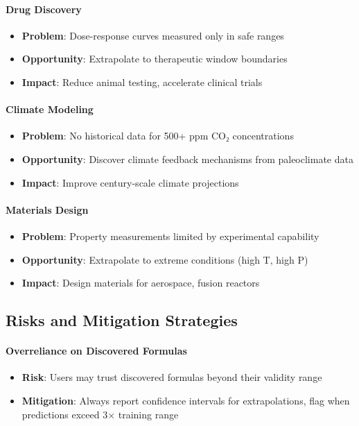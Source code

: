 \paragraph{Drug Discovery}
\begin{itemize}
    \item \textbf{Problem}: Dose-response curves measured only in safe ranges
    \item \textbf{Opportunity}: Extrapolate to therapeutic window boundaries
    \item \textbf{Impact}: Reduce animal testing, accelerate clinical trials
\end{itemize}

\paragraph{Climate Modeling}
\begin{itemize}
    \item \textbf{Problem}: No historical data for 500+ ppm CO₂ concentrations
    \item \textbf{Opportunity}: Discover climate feedback mechanisms from paleoclimate data
    \item \textbf{Impact}: Improve century-scale climate projections
\end{itemize}

\paragraph{Materials Design}
\begin{itemize}
    \item \textbf{Problem}: Property measurements limited by experimental capability
    \item \textbf{Opportunity}: Extrapolate to extreme conditions (high T, high P)
    \item \textbf{Impact}: Design materials for aerospace, fusion reactors
\end{itemize}

\subsection{Risks and Mitigation Strategies}

\paragraph{Overreliance on Discovered Formulas}
\begin{itemize}
    \item \textbf{Risk}: Users may trust discovered formulas beyond their validity range
    \item \textbf{Mitigation}: Always report confidence intervals for extrapolations, flag when predictions exceed 3× training range
\end{itemize}

